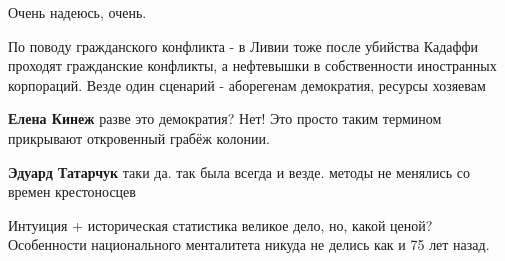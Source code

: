 \begin{itemize}
\begin{itemize}
\end{itemize}

 
Очень надеюсь, очень.

 

По поводу гражданского конфликта - в Ливии тоже после убийства Кадаффи проходят
гражданские конфликты, а нефтевышки в собственности иностранных корпораций.
Везде один сценарий - аборегенам демократия, ресурсы хозяевам

\begin{itemize}
 
\textbf{Елена Кинеж} разве это демократия? Нет! Это просто таким термином прикрывают откровенный грабёж колонии.

 
\textbf{Эдуард Татарчук} таки да. так была всегда и везде. методы не менялись со времен крестоносцев
\end{itemize}

 
Интуиция + историческая статистика великое дело, но, какой ценой? Особенности национального менталитета никуда не делись как и 75 лет назад.

 

\end{itemize}
